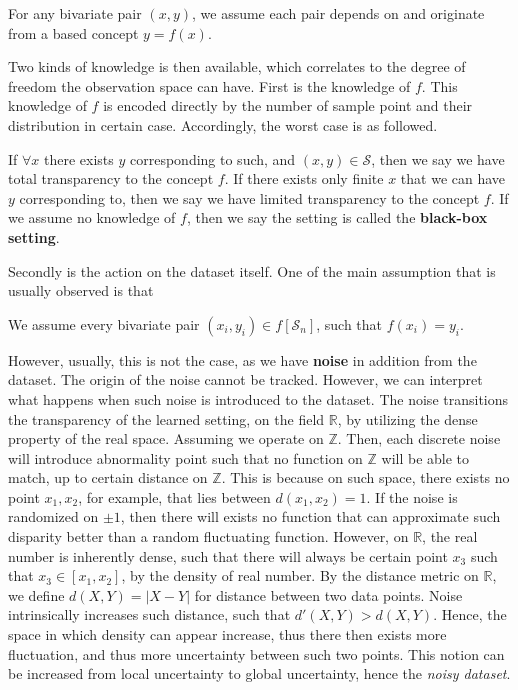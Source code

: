 \documentclass[
  journal=largetwo,
  year=2025,
  volume=37,
]{cup-journal}
\begin{document}
\begin{assumption}[Transparency]
    For any bivariate pair $(x,y)$, we assume each pair depends on and originate from a based concept $y=f(x)$. 
\end{assumption}

Two kinds of knowledge is then available, which correlates to the degree of freedom the observation space can have. First is the knowledge of $f$. This knowledge of $f$ is encoded directly by the number of sample point and their distribution in certain case. Accordingly, the worst case is as followed. 

\begin{conjecture}
    If $\forall x$ there exists $y$ corresponding to such, and $(x,y)\in \mathcal{S}$, then we say we have total transparency to the concept $f$. If there exists only finite $x$ that we can have $y$ corresponding to, then we say we have limited transparency to the concept $f$. If we assume no knowledge of $f$, then we say the setting is called the \textbf{black-box setting}. 
\end{conjecture}

Secondly is the action on the dataset itself. One of the main assumption that is usually observed is that 

\begin{assumption}[Fallacy]
    We assume every bivariate pair $(x_{i},y_{i})\in f[\mathcal{S}_{n}]$, such that $f(x_{i})=y_{i}$. 
\end{assumption}

However, usually, this is not the case, as we have \textbf{noise} in addition from the dataset. The origin of the noise cannot be tracked. However, we can interpret what happens when such noise is introduced to the dataset. The noise transitions the transparency of the learned setting, on the field $\mathbb{R}$, by utilizing the dense property of the real space. Assuming we operate on $\mathbb{Z}$. Then, each discrete noise will introduce abnormality point such that no function on $\mathbb{Z}$ will be able to match, up to certain distance on $\mathbb{Z}$. This is because on such space, there exists no point $x_1, x_{2}$, for example, that lies between $d(x_{1},x_{2})=1$. If the noise is randomized on $\pm 1$, then there will exists no function that can approximate such disparity better than a random fluctuating function. However, on $\mathbb{R}$, the real number is inherently dense, such that there will always be certain point $x_{3}$ such that $x_{3}\in [x_{1},x_{2}]$, by the density of real number. By the distance metric on $\mathbb{R}$, we define $d(X,Y)=|X-Y|$ for distance between two data points. Noise intrinsically increases such distance, such that $d'(X,Y)> d(X,Y)$. Hence, the space in which density can appear increase, thus there then exists more fluctuation, and thus more uncertainty between such two points. This notion can be increased from local uncertainty to global uncertainty, hence the \textit{noisy dataset}. 
\end{document}
